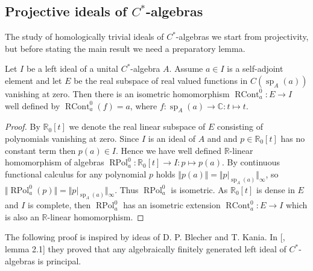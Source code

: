 
\subsection{Projective ideals of \texorpdfstring{$C^*$}{C*}-algebras}
\label{SubSectionProjectiveIdealsOfCStarAlgebras}

The study of homologically trivial ideals of $C^*$-algebras we start from projectivity, but before stating the main result we need a preparatory lemma.

\begin{lemma}\label{ContFuncCalcOnIdealOfCStarAlg} Let $I$ be a left ideal of a unital $C^*$-algebra $A$. Assume $a\in I$ is a self-adjoint element and let $E$ be the real subspace of real valued functions in $C(\operatorname{sp}_A(a))$ vanishing at zero. Then there is an isometric homomorphism $\operatorname{RCont}_a^0:E\to I$ well defined by $\operatorname{RCont}_a^0(f)=a$, where $f:\operatorname{sp}_A(a)\to\mathbb{C}:t\mapsto t$.
\end{lemma}
\begin{proof} By $\mathbb{R}_0[t]$ we denote the real linear subspace of $E$ consisting of polynomials vanishing at zero. Since $I$ is an ideal of $A$ and and $p\in\mathbb{R}_0[t]$ has no constant term then $p(a)\in I$.  Hence we have well defined $\mathbb{R}$-linear homomorphism of algebras $\operatorname{RPol}_a^0:\mathbb{R}_0[t]\to I:p\mapsto p(a)$. By continuous functional calculus for any polynomial $p$ holds $\Vert p(a)\Vert=\Vert p|_{\operatorname{sp}_A(a)}\Vert_\infty$, so $\Vert\operatorname{RPol}_a^0(p)\Vert=\Vert p|_{\operatorname{sp}_A(a)}\Vert_\infty$. Thus $\operatorname{RPol}_a^0$ is isometric. As $\mathbb{R}_0[t]$ is dense in $E$ and $I$ is complete, then $\operatorname{RPol}_a^0$ has an isometric extension $\operatorname{RCont}_a^0:E\to I$ which is also an $\mathbb{R}$-linear homomorphism. 
\end{proof}

The following proof is inspired by ideas of D. P. Blecher and T. Kania. In [\cite{BleKanFinGenCStarAlgHilbMod}, lemma 2.1] they proved that any algebraically finitely generated left ideal of $C^*$-algebras is principal.  


